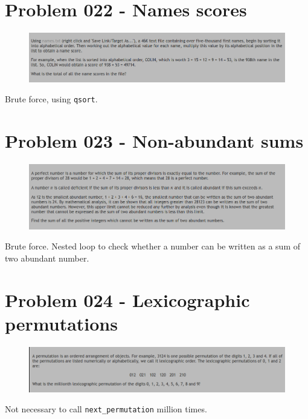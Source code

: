 \section{Problem 022 - Names scores}
\begin{prob}
	\begin{figure}[htb!]
		\begin{center}
			\includegraphics[scale = 0.4]{pic/022.png}
		\end{center}
	\end{figure}
\end{prob}
\begin{sol}
Brute force, using \texttt{qsort}.
\end{sol}
\newpage
\section{Problem 023 - Non-abundant sums}
\begin{prob}
	\begin{figure}[htb!]
		\begin{center}
			\includegraphics[scale = 0.4]{pic/023.png}
		\end{center}
	\end{figure}
\end{prob}
\begin{sol}
Brute force. Nested loop to check whether a number can be written as a sum of two abundant number.
\end{sol}
\section{Problem 024 - Lexicographic permutations}
\begin{prob}
	\begin{figure}[htb!]
		\begin{center}
			\includegraphics[scale = 0.4]{pic/024.png}
		\end{center}
	\end{figure}
\end{prob}
\begin{sol}
Not necessary to call \texttt{next\_permutation} million times. 
\end{sol}
\newpage
